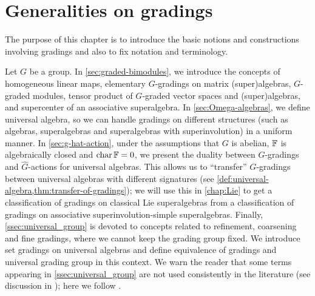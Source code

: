\chapter{Generalities on gradings}\label{sec:generalities}




The purpose of this chapter is to introduce the basic notions and constructions involving gradings and also to fix notation and terminology.  

Let $G$ be a group. 
In \cref{sec:graded-bimodules}, we introduce the concepts of homogeneous linear maps, elementary $G$-gradings on matrix (super)algebras, $G$-graded modules, tensor product of $G$-graded vector spaces and (super)algebras, and supercenter of an associative superalgebra.
In \cref{sec:Omega-algebras}, we define universal algebra, so we can handle gradings on different structures (such as algebras, superalgebras and superalgebras with superinvolution) in a uniform manner. 
In \cref{sec:g-hat-action}, under the assumptions that $G$ is abelian, $\mathbb{F}$ is algebraically closed and $\operatorname{char} \mathbb{F} = 0$, we present the duality between $G$-gradings and $\widehat G$-actions for universal algebras. 
This allows us to ``transfer'' $G$-gradings between universal algebras with different signatures (see  \cref{def:universal-algebra,thm:transfer-of-gradings}); we will use this in \cref{chap:Lie} to get a classification of gradings on classical Lie superalgebras from a classification of gradings on associative superinvolution-simple superalgebras. 
Finally, \cref{ssec:universal_group} is devoted to concepts related to refinement, coarsening and fine gradings, where we cannot keep the grading group fixed. 
We introduce set gradings on universal algebras and define equivalence of gradings and universal grading group in this context. 
We warn the reader that some terms appearing in \cref{ssec:universal_group} are not used consistently in the literature (see discussion in \cite[Section 2.7]{GS}); here we follow \cite{livromicha}. 

